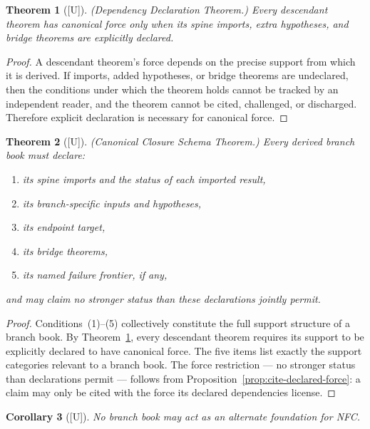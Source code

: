 \documentclass[12pt,oneside]{amsbook}
\theoremstyle{plain}
\newtheorem{theorem}{Theorem}[section]
\newtheorem{corollary}[theorem]{Corollary}
\theoremstyle{definition}
\theoremstyle{remark}
\newcommand{\status}[1]{\textup{[#1]}}
\begin{document}
\begin{theorem}[\status{U}]\label{thm:dependency-declaration}
\textup{(Dependency Declaration Theorem.)}  Every descendant theorem
has canonical force only when its spine imports, extra hypotheses, and
bridge theorems are explicitly declared.
\end{theorem}

\begin{proof}
A descendant theorem's force depends on the precise support from which
it is derived.  If imports, added hypotheses, or bridge theorems are
undeclared, then the conditions under which the theorem holds cannot
be tracked by an independent reader, and the theorem cannot be cited,
challenged, or discharged.  Therefore explicit declaration is
necessary for canonical force.
\end{proof}

\begin{theorem}[\status{U}]\label{thm:closure-schema}
\textup{(Canonical Closure Schema Theorem.)}  Every derived branch
book must declare:
\begin{enumerate}[label=\textup{(\arabic*)}]
  \item its spine imports and the status of each imported result,
  \item its branch-specific inputs and hypotheses,
  \item its endpoint target,
  \item its bridge theorems,
  \item its named failure frontier, if any,
\end{enumerate}
and may claim no stronger status than these declarations jointly
permit.
\end{theorem}

\begin{proof}
Conditions~(1)--(5) collectively constitute the full support structure
of a branch book.  By Theorem~\ref{thm:dependency-declaration}, every
descendant theorem requires its support to be explicitly declared to
have canonical force.  The five items list exactly the support
categories relevant to a branch book.  The force restriction --- no
stronger status than declarations permit --- follows from
Proposition~\ref{prop:cite-declared-force}: a claim may only be cited
with the force its declared dependencies license.
\end{proof}

\begin{corollary}[\status{U}]\label{cor:no-alternate-foundation}
No branch book may act as an alternate foundation for NFC.
\end{corollary}
\end{document}
